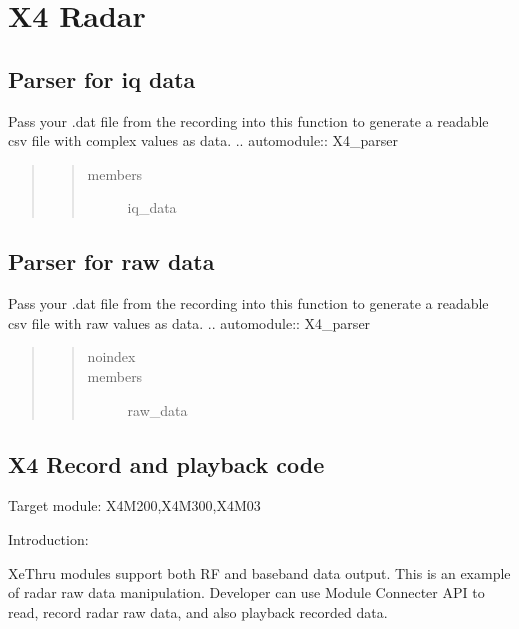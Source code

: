 \documentclass[letterpaper,10pt,english]{sphinxmanual}
\begin{document}
\section{X4 Radar}
\label{\detokenize{X4 radar:x4-radar}}\label{\detokenize{X4 radar::doc}}

\subsection{Parser for iq data}
\label{\detokenize{X4 radar:parser-for-iq-data}}
Pass your .dat file from the recording into this function to generate a readable csv file with complex values as data.
.. automodule:: X4\_parser
\begin{quote}
\begin{quote}\begin{description}
\item[{members}] \leavevmode
iq\_data

\end{description}\end{quote}
\end{quote}


\subsection{Parser for raw data}
\label{\detokenize{X4 radar:parser-for-raw-data}}
Pass your .dat file from the recording into this function to generate a readable csv file with raw values as data.
.. automodule:: X4\_parser
\begin{quote}
\begin{quote}\begin{description}
\item[{noindex}] \leavevmode
\item[{members}] \leavevmode
raw\_data

\end{description}\end{quote}
\end{quote}


\subsection{X4 Record and playback code}
\label{\detokenize{X4 radar:x4-record-and-playback-code}}
Target module: X4M200,X4M300,X4M03

Introduction:

XeThru modules support both RF and baseband data output. This is an example of radar raw data manipulation.
Developer can use Module Connecter API to read, record radar raw data, and also playback recorded data.
\end{document}
